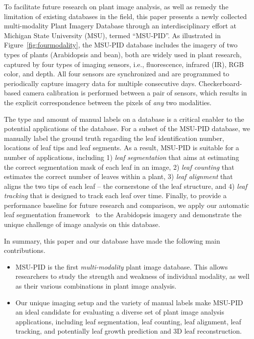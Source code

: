 To facilitate future research on plant image analysis, as well as remedy the limitation of existing databases in the field, this paper presents a newly collected multi-modality Plant Imagery Database through an interdisciplinary effort at Michigan State University (MSU), termed ``MSU-PID''.
As illustrated in Figure~\ref{fig:fourmodality}, the MSU-PID database includes the imagery of two types of plants (Arabidopsis and bean), both are widely used in plant research, captured by four types of imaging sensors, i.e., fluorescence, infrared (IR), RGB color, and depth.
All four sensors are synchronized and are programmed to periodically capture imagery data for multiple consecutive days.
Checkerboard-based camera calibration is performed between a pair of sensors, which results in the explicit correspondence between the pixels of {\it any} two modalities.

The type and amount of manual labels on a database is a critical enabler to the potential applications of the database.
For a subset of the MSU-PID database, we manually label the ground truth regarding the leaf identification number, locations of leaf tips and leaf segments.
As a result, MSU-PID is suitable for a number of applications, including 1) {\it leaf segmentation} that aims at estimating the correct segmentation mask of each leaf in an image, 2) {\it leaf counting} that estimates the correct number of leaves within a plant, 3) {\it leaf alignment} that aligns the two tips of each leaf -- the cornerstone of the leaf structure, and 4) {\it leaf tracking} that is designed to track each leaf over time.
Finally, to provide a performance baseline for future research and comparison, we apply our automatic leaf segmentation framework~\cite{yin2014a,yin2014b} to the Arabidopsis imagery and demonstrate the unique challenge of image analysis on this database.

In summary, this paper and our database have made the following main contributions.
\begin{itemize}
\item MSU-PID is the first {\it multi-modality} plant image database. This allows researchers to study the strength and weakness of individual modality, as well as their various combinations in plant image analysis.
\item Our unique imaging setup and the variety of manual labels make MSU-PID an ideal candidate for evaluating a diverse set of plant image analysis applications, including leaf segmentation, leaf counting, leaf alignment, leaf tracking, and potentially leaf growth prediction and $3$D leaf reconstruction.
\end{itemize}










